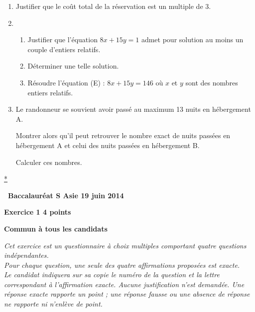 \documentclass[10pt]{article}
\begin{document}
\begin{enumerate}
\begin{enumerate}
	\end{enumerate}
\item Justifier que le coût total de la réservation est un multiple de 3.
\item 
	\begin{enumerate}
	\item Justifier que l'équation $8x + 15y = 1$ admet pour solution au moins un couple d'entiers relatifs.
	\item Déterminer une telle solution.
	\item Résoudre l'équation (E) : $8x + 15y = 146$ où $x$ et $y$ sont des nombres entiers relatifs.
	\end{enumerate}
\item Le randonneur se souvient avoir passé au maximum 13 nuits en hébergement A.

Montrer alors qu'il peut retrouver le nombre exact de nuits passées en hébergement A et celui des nuits passées en hébergement B.

Calculer ces nombres.
\end{enumerate}

\hyperlink{Index}{*}
\newpage
\hypertarget{Asie}{}

\renewcommand \footrulewidth{.2pt}
\pagestyle{fancy}
\thispagestyle{empty}

\begin{center}{\Large{\textbf{\decofourleft~Baccalauréat S Asie 
19 juin 2014~\decofourright}}} \end{center}

\vspace{0,25cm}

\textbf{Exercice 1 \hfill 4 points}

\textbf{Commun à tous les candidats}

\medskip

\emph{Cet exercice est un questionnaire à choix multiples comportant quatre questions indépendantes.\\
Pour chaque question, une seule des quatre affirmations proposées est exacte.\\
Le candidat indiquera sur sa copie le numéro de la question et la lettre correspondant à l'affirmation exacte. Aucune justification n'est demandée. Une réponse exacte rapporte un point ; une réponse fausse ou une absence de réponse ne rapporte ni n'enlève de point.}
\end{document}
